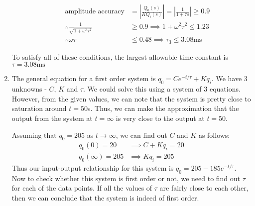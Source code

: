 \documentclass[a4paper, 11pt]{article}
\begin{document}
\begin{enumerate}[label=(\arabic*),leftmargin=*]
\begin{enumerate}[label=\Roman*)]
	\begin{align*}
	\text{amplitude accuracy}&=\left|\frac{Q_0(s)}{KQ_i(s)}\right|=\left|\frac{1}{1+\tau s}\right|\geqslant 0.9\\
	\therefore \frac{1}{\sqrt{1+\omega^2\tau^2}}&\geqslant 0.9\implies 1+\omega^2\tau^2\leqslant 1.23\\
	\therefore \omega\tau&\leqslant 0.48\implies \tau_3\leqslant 3.08\text{ms}
	\end{align*}
\end{enumerate}
To satisfy all of these conditions, the largest allowable time constant is $\boxed{\tau=3.08\text{ms}}$
	\newpage
	\item The general equation for a first order system is $q_0=Ce^{-t/\tau}+Kq_i$. We have 3 unknowns - $C$, $K$ and $\tau$. We could solve this using a system of 3 equations. However, from the given values, we can note that the system is pretty close to saturation around $t=50$s. Thus, we can make the approximation that the output from the system at $t=\infty$ is very close to the output at $t=50$.
	
	Assuming that $q_0=205$ as $t\to\infty$, we can find out $C$ and $K$ as follows:
	\begin{align*}
		q_0(0)=20&\implies C+Kq_i=20\\
		q_0(\infty)=205&\implies Kq_i=205
	\end{align*}
Thus our input-output relationship for this system is $q_0=205-185e^{-t/\tau}$. Now to check whether this system is first order or not, we need to find out $\tau$ for each of the data points. If all the values of $\tau$ are fairly close to each other, then we can conclude that the system is indeed of first order.


\end{enumerate}
\end{document}
